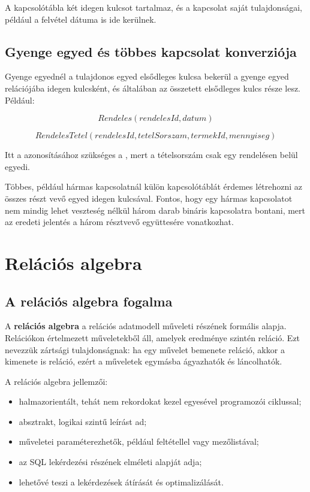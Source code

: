 A  kapcsolótábla két idegen kulcsot tartalmaz, és a kapcsolat saját tulajdonságai, például a felvétel dátuma is ide kerülnek.

\subsection{Gyenge egyed és többes kapcsolat konverziója}

Gyenge egyednél a tulajdonos egyed elsődleges kulcsa bekerül a gyenge egyed relációjába idegen kulcsként, és általában az összetett elsődleges kulcs része lesz. Például:

\[
  Rendeles(rendelesId, datum)
\]

\[
  RendelesTetel(rendelesId, tetelSorszam, termekId, mennyiseg)
\]

Itt a  azonosításához szükséges a , mert a tételsorszám csak egy rendelésen belül egyedi.

Többes, például hármas kapcsolatnál külön kapcsolótáblát érdemes létrehozni az összes részt vevő egyed idegen kulcsával. Fontos, hogy egy hármas kapcsolatot nem mindig lehet veszteség nélkül három darab bináris kapcsolatra bontani, mert az eredeti jelentés a három résztvevő együttesére vonatkozhat.

\section{Relációs algebra}

\subsection{A relációs algebra fogalma}

A \textbf{relációs algebra} a relációs adatmodell műveleti részének formális alapja. Relációkon értelmezett műveletekből áll, amelyek eredménye szintén reláció. Ezt nevezzük zártsági tulajdonságnak: ha egy művelet bemenete reláció, akkor a kimenete is reláció, ezért a műveletek egymásba ágyazhatók és láncolhatók.

A relációs algebra jellemzői:

\begin{itemize}
  \item halmazorientált, tehát nem rekordokat kezel egyesével programozói ciklussal;
  \item absztrakt, logikai szintű leírást ad;
  \item műveletei paraméterezhetők, például feltétellel vagy mezőlistával;
  \item az SQL lekérdezési részének elméleti alapját adja;
  \item lehetővé teszi a lekérdezések átírását és optimalizálását.
\end{itemize}

